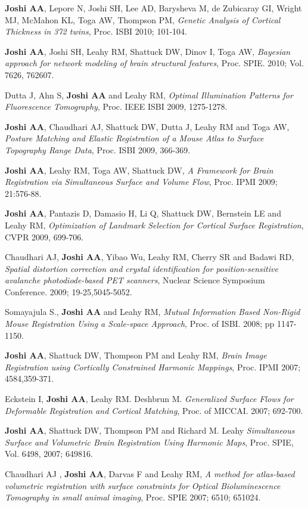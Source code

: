 \documentclass[overlapped,line,letterpaper]{res}
\begin{document}
\begin{resume}
\textbf{Joshi AA}, Lepore N, Joshi SH, Lee AD, Barysheva M, de Zubicaray GI, Wright MJ, McMahon KL, Toga AW, Thompson PM, \textit{Genetic Analysis of Cortical Thickness in 372 twins}, Proc. ISBI 2010; 101-104.

\textbf{Joshi AA}, Joshi SH, Leahy RM, Shattuck DW, Dinov I, Toga AW, \textit{Bayesian approach for network modeling of brain structural features}, Proc. SPIE. 2010; Vol. 7626, 762607.

Dutta J, Ahn S, \textbf{Joshi AA} and Leahy RM, \textit{Optimal Illumination Patterns for Fluorescence Tomography}, Proc. IEEE ISBI 2009, 1275-1278.

\textbf{Joshi AA}, Chaudhari AJ, Shattuck DW, Dutta J, Leahy RM and Toga AW, \textit{Posture Matching and Elastic Registration of a Mouse Atlas to Surface Topography Range Data}, Proc. ISBI 2009, 366-369.

\textbf{Joshi AA}, Leahy RM, Toga AW, Shattuck DW, \textit{A Framework for Brain Registration via Simultaneous Surface and Volume Flow}, Proc. IPMI 2009; 21:576-88.

\textbf{Joshi AA}, Pantazis D, Damasio H, Li Q, Shattuck DW, Bernstein LE and Leahy RM, \textit{Optimization of Landmark Selection for Cortical Surface Registration}, CVPR 2009, 699-706. 

Chaudhari AJ, \textbf{Joshi AA}, Yibao Wu, Leahy RM, Cherry SR and Badawi RD, \textit{Spatial distortion correction and crystal identification for position-sensitive avalanche photodiode-based PET scanners}, Nuclear Science Symposium Conference. 2009; 19-25,5045-5052.

Somayajula S., \textbf{Joshi AA}  and Leahy RM, \textit{Mutual Information Based Non-Rigid Mouse Registration Using a  Scale-space Approach}, Proc. of ISBI. 2008; pp 1147-1150. 

\textbf{Joshi AA}, Shattuck DW, Thompson PM and Leahy RM, \textit{Brain Image Registration using Cortically Constrained Harmonic Mappings}, Proc. IPMI 2007; 4584,359-371.

Eckstein I, \textbf{Joshi AA}, Leahy RM. Deshbrun M. \textit{Generalized Surface Flows for Deformable Registration and Cortical Matching}, Proc. of MICCAI. 2007; 692-700.

\textbf{Joshi AA}, Shattuck DW, Thompson PM and Richard M. Leahy \textit{Simultaneous Surface and Volumetric Brain Registration Using Harmonic Maps}, Proc. SPIE, Vol. 6498, 2007; 649816.

Chaudhari AJ , \textbf{Joshi AA}, Darvas F and Leahy RM, \textit{A method for atlas-based volumetric registration with surface constraints for Optical Bioluminescence Tomography in small animal imaging}, Proc. SPIE 2007; 6510; 651024.


\end{resume}
\end{document}
